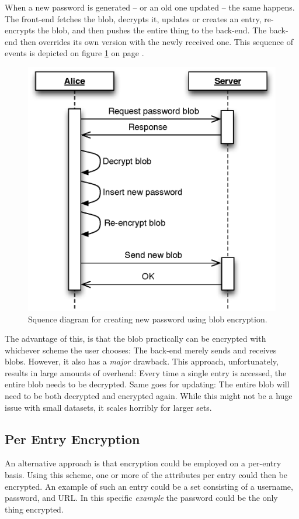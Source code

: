 			When a new password is generated -- or an old one updated -- the same happens. The front-end fetches the blob, decrypts it, updates or creates an entry, re-encrypts the blob, and then pushes the entire thing to the back-end. The back-end then overrides its own version with the newly received one. This sequence of events is depicted on figure \ref{fig:seq_blob} on page \pageref{fig:seq_blob}.

			\begin{figure}[h!]
				\centering
				\includegraphics[width=\textwidth]{figures/design/uml/sequence/blob.eps}
				\caption{Squence diagram for creating new password using blob encryption.}
				\label{fig:seq_blob}
			\end{figure}

			The advantage of this, is that the blob practically can be encrypted with whichever scheme the user chooses: The back-end merely sends and receives blobs. However, it also has a \emph{major} drawback. This approach, unfortunately, results in large amounts of overhead: Every time a single entry is accessed, the entire blob needs to be decrypted. Same goes for updating: The entire blob will need to be both decrypted and encrypted again. While this might not be a huge issue with small datasets, it scales horribly for larger sets.

		\subsection{Per Entry Encryption}
			An alternative approach is that encryption could be employed on a per-entry basis. Using this scheme, one or more of the attributes per entry could then be encrypted. An example of such an entry could be a set consisting of a username, password, and URL. In this specific \emph{example} the password could be the only thing encrypted. 

